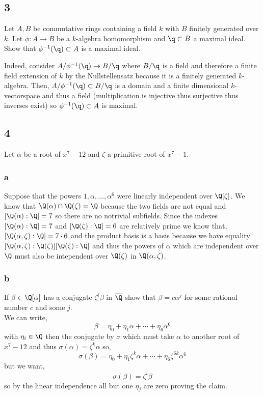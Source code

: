 \documentclass[12pt]{article}
\begin{document}
\subsection{3}

\begin{exercise}
Let $A,B$ be commutative rings containing a field $k$ with $B$ finitely generated over $k$. Let $\phi : A \to B$ be a $k$-algebra homomorphism and $\q \subset B$ a maximal ideal. Show that $\phi^{-1}(\q) \subset A$ is a maximal ideal.
\end{exercise}

Indeed, consider $A / \phi^{-1}(\q) \to B / \q$ where $B / \q$ is a field and therefore a finite field extension of $k$ by the Nullstellensatz because it is a finitely generated $k$-algebra. Then, $A /\phi^{-1}(\q) \subset B / \q$ is a domain and a finite dimensional $k$-vectorspace and thus a field (multiplication is injective thus surjective thus inverses exist) so $\phi^{-1}(\q) \subset A$ is maximal.

\subsection{4}

Let $\alpha$ be a root of $x^7 - 12$ and $\zeta$ a primitive root of $x^7 - 1$.

\subsubsection{a}

Suppose that the powers $1, \alpha, \dots, \alpha^6$ were linearly independent over $\Q[\zeta]$. We know that $\Q(\alpha) \cap \Q(\zeta) = \Q$ because the two fields are not equal and $[\Q(\alpha) : \Q] = 7$ so there are no notrivial subfields. Since the indexes $[\Q(\alpha) : \Q] = 7$ and $[\Q(\zeta) : \Q] = 6$ are relatively prime we know that, $[\Q(\alpha, \zeta) : \Q] = 7 \cdot 6$ and the product basis is a basis because we have equality $[\Q(\alpha, \zeta) : \Q(\zeta)][\Q(\zeta) : \Q]$ and thus the powers of $\alpha$ which are independent over $\Q$ must also be intependent over $\Q(\zeta)$ in $\Q(\alpha, \zeta)$.

\subsubsection{b}

If $\beta \in \Q[\alpha]$ has a conjugate $\zeta^i \beta$ in $\overline{\Q}$ show that $\beta = c \alpha^j$ for some rational number $c$ and some $j$.
\bigskip\\
We can write,
\[ \beta = \eta_0 + \eta_1 \alpha + \cdots + \eta_6 \alpha^6 \]
with $\eta_i \in \Q$
then the conjugate by $\sigma$ which must take $\alpha$ to another root of $x^7 - 12$ and thus $\sigma(\alpha) = \zeta^k \alpha$ so,
\[ \sigma(\beta) = \eta_0 + \eta_1 \zeta^k \alpha + \cdots + \eta_6 \zeta^{6k} \alpha^6 \]
but we want,
\[ \sigma(\beta) = \zeta^i \beta \]
so by the linear independence all but one $\eta_j$ are zero proving the claim.
\end{document}
